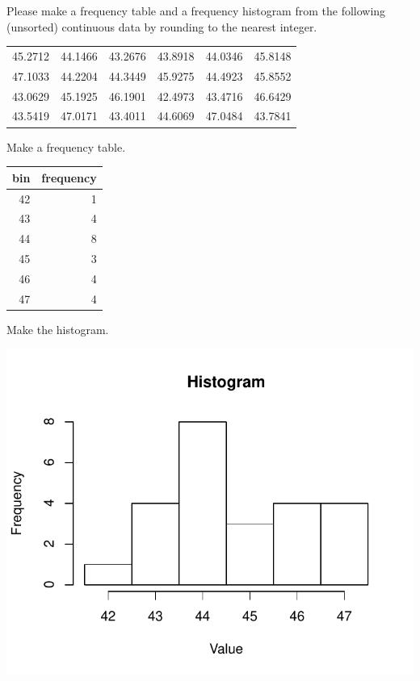 
\begin{question}
Please make a frequency table and a frequency histogram from the
following (unsorted) continuous data by rounding to the nearest integer.

\begin{longtable}[]{@{}rrrrrr@{}}
\toprule
\endhead
45.2712 & 44.1466 & 43.2676 & 43.8918 & 44.0346 & 45.8148\tabularnewline
47.1033 & 44.2204 & 44.3449 & 45.9275 & 44.4923 & 45.8552\tabularnewline
43.0629 & 45.1925 & 46.1901 & 42.4973 & 43.4716 & 46.6429\tabularnewline
43.5419 & 47.0171 & 43.4011 & 44.6069 & 47.0484 & 43.7841\tabularnewline
\bottomrule
\end{longtable}
\end{question}

\begin{solution}
Make a frequency table.

\begin{longtable}[]{@{}rr@{}}
\toprule
bin & frequency\tabularnewline
\midrule
\endhead
42 & 1\tabularnewline
43 & 4\tabularnewline
44 & 8\tabularnewline
45 & 3\tabularnewline
46 & 4\tabularnewline
47 & 4\tabularnewline
\bottomrule
\end{longtable}

Make the histogram.

\includegraphics{barchart-1-5.pdf}\\
\end{solution}

